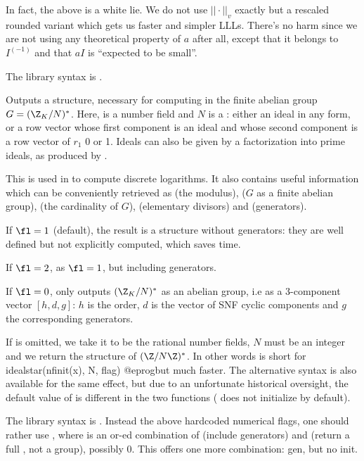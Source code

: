  In fact, the above is a white lie.
We do not use $||\cdot||_v$ exactly but a rescaled rounded variant which
gets us faster and simpler LLLs. There's no harm since we are not using any
theoretical property of $a$ after all, except that it belongs to $I^(-1)$
and that $a I$ is ``expected to be small''.

The library syntax is .

\label{se:idealstar}
Outputs a  structure,
necessary for computing in the finite abelian group $G = (\Z_K/N)^*$. Here,
 is a number field and $N$ is a : either an ideal in any
form, or a row vector whose first component is an ideal and whose second
component is a row vector of $r_1$ 0 or 1. Ideals can also be given
by a factorization into prime ideals, as produced by .

This  is used in  to compute discrete logarithms. It
also contains useful information which can be conveniently retrieved as
 (the modulus),
 ($G$ as a finite abelian group),
 (the cardinality of $G$),
 (elementary divisors) and
 (generators).

If $\fl=1$ (default), the result is a  structure without
generators: they are well defined but not explicitly computed, which saves
time.

If $\fl=2$, as $\fl=1$, but including generators.

If $\fl=0$, only outputs $(\Z_K/N)^*$ as an abelian group,
i.e as a 3-component vector $[h,d,g]$: $h$ is the order, $d$ is the vector of
SNF cyclic components and $g$ the corresponding
generators.

If  is omitted, we take it to be the rational number fields, $N$ must
be an integer and we return the structure of $(\Z/N\Z)^*$. In other words
 is short for
\bprog
  idealstar(nfinit(x), N, flag)
@eprog\noindent but much faster. The alternative syntax 
is also available for the same effect, but due to an unfortunate historical
oversight, the default value of  is different in the two
functions ( does not initialize by default).

The library syntax is .
Instead the above hardcoded numerical flags, one should rather use
, where  is
an or-ed combination of  (include generators) and 
(return a full , not a group), possibly $0$. This offers
one more combination: gen, but no init.

